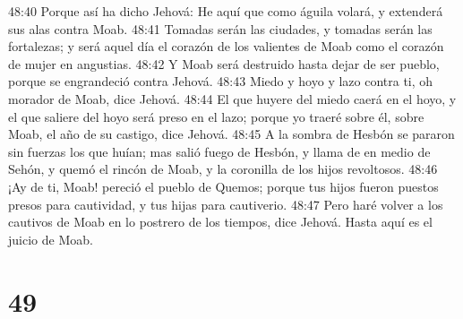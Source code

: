 48:40 Porque así ha dicho Jehová: He aquí que como águila volará, y extenderá sus alas contra Moab.  
48:41 Tomadas serán las ciudades, y tomadas serán las fortalezas; y será aquel día el corazón de los valientes de Moab como el corazón de mujer en angustias.  
48:42 Y Moab será destruido hasta dejar de ser pueblo, porque se engrandeció contra Jehová.  
48:43 Miedo y hoyo y lazo contra ti, oh morador de Moab, dice Jehová.  
48:44 El que huyere del miedo caerá en el hoyo, y el que saliere del hoyo será preso en el lazo; porque yo traeré sobre él, sobre Moab, el año de su castigo, dice Jehová.  
48:45 A la sombra de Hesbón se pararon sin fuerzas los que huían; mas salió fuego de Hesbón, y llama de en medio de Sehón, y quemó el rincón de Moab, y la coronilla de los hijos revoltosos.  
48:46 ¡Ay de ti, Moab! pereció el pueblo de Quemos; porque tus hijos fueron puestos presos para cautividad, y tus hijas para cautiverio.  
48:47 Pero haré volver a los cautivos de Moab en lo postrero de los tiempos, dice Jehová. Hasta aquí es el juicio de Moab.  

\chapter{49}


